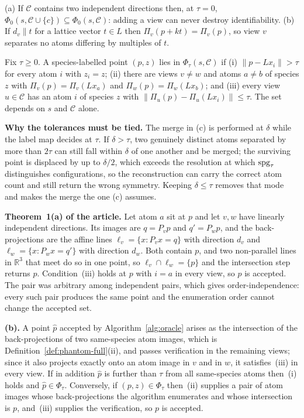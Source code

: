 \begin{corollary}
\label{cor:design}
(a) If $\mathcal{C}$ contains two independent directions then, at $\tau = 0$,
$\Phi_0(s, \mathcal{C} \cup \{c\}) \subseteq \Phi_0(s, \mathcal{C})$: adding a view can never destroy
identifiability. (b) If $d_v \parallel t$ for a lattice vector $t \in L$ then $\Pi_v(p + kt) = \Pi_v(p)$, so
view $v$ separates no atoms differing by multiples of $t$.
\end{corollary}

\begin{definition}
\label{def:phantom-full}
Fix $\tau \ge 0$. A species-labelled point $(p, z)$ lies in $\Phi_\tau(s,\mathcal{C})$ if
(i) $\|p - L x_i\| > \tau$ for every atom $i$ with $z_i = z$;
(ii) there are views $v \neq w$ and atoms $a \neq b$ of species $z$ with $\Pi_v(p) = \Pi_v(L x_a)$ and
$\Pi_w(p) = \Pi_w(L x_b)$; and
(iii) every view $u \in \mathcal{C}$ has an atom $i$ of species $z$ with
$\|\Pi_u(p) - \Pi_u(L x_i)\| \le \tau$.
The set depends on $s$ and $\mathcal{C}$ alone.
\end{definition}

\textbf{Why the tolerances must be tied.} The merge in (c) is performed at $\delta$ while the label map
decides at $\tau$. If $\delta > \tau$, two genuinely distinct atoms separated by more than $2\tau$ can still
fall within $\delta$ of one another and be merged; the surviving point is displaced by up to $\delta/2$, which
exceeds the resolution at which $\mathrm{spg}_\tau$ distinguishes configurations, so the reconstruction can carry the
correct atom count and still return the wrong symmetry. Keeping $\delta \le \tau$ removes that mode and makes
the merge the one (c) assumes.

\textbf{Theorem~1(a) of the article.} Let atom $a$ sit at $p$ and let $v,w$ have linearly independent
directions. Its images are $q = P_v p$ and $q' = P_w p$, and the back-projections are the affine lines
$\ell_v = \{x : P_v x = q\}$ with direction $d_v$ and $\ell_w = \{x : P_w x = q'\}$ with direction $d_w$.
Both contain $p$, and two non-parallel lines in $\mathbb{R}^3$ that meet do so in one point, so
$\ell_v \cap \ell_w = \{p\}$ and the intersection step returns $p$. Condition~(iii) holds at $p$ with
$i = a$ in every view, so $p$ is accepted. The pair was arbitrary among independent pairs, which gives
order-independence: every such pair produces the same point and the enumeration order cannot change the
accepted set.

\textbf{(b).} A point $\hat p$ accepted by Algorithm~\ref{alg:oracle} arises as the intersection of the
back-projections of two same-species atom images, which is Definition~\ref{def:phantom-full}(ii), and passes
verification in the remaining views; since it also projects exactly onto an atom image in $v$ and in $w$, it
satisfies~(iii) in every view. If in addition $\hat p$ is further than $\tau$ from all same-species atoms
then~(i) holds and $\hat p \in \Phi_\tau$. Conversely, if $(p,z) \in \Phi_\tau$ then~(ii) supplies a pair
of atom images whose back-projections the algorithm enumerates and whose intersection is $p$, and~(iii)
supplies the verification, so $p$ is accepted.

